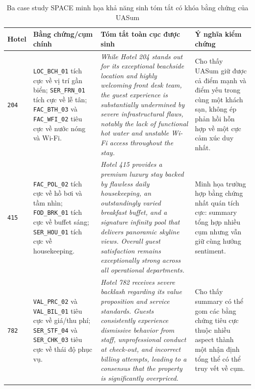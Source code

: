 \begin{table}[tbp]
\centering
\caption{Ba case study SPACE minh họa khả năng sinh tóm tắt có khóa bằng chứng của UASum}
\label{tab:method1-space-case-summary}
\scriptsize
\setlength{\tabcolsep}{3pt}
\renewcommand{\arraystretch}{1.10}
\begin{tabularx}{\textwidth}{L{0.12\textwidth} L{0.30\textwidth} Y Y}
\toprule
\textbf{Hotel} & \textbf{Bằng chứng/cụm chính} & \textbf{Tóm tắt toàn cục được sinh} & \textbf{Ý nghĩa kiểm chứng} \\
\midrule
\texttt{204} &
\texttt{LOC\_BCH\_01} tích cực về vị trí gần biển; \texttt{SER\_FRN\_01} tích cực về lễ tân; \texttt{FAC\_BTH\_03} và \texttt{FAC\_WFI\_02} tiêu cực về nước nóng và Wi-Fi. &
\textit{While Hotel 204 stands out for its exceptional beachside location and highly welcoming front desk team, the guest experience is substantially undermined by severe infrastructural flaws, notably the lack of functional hot water and unstable Wi-Fi access throughout the stay.} &
Cho thấy UASum giữ được cả điểm mạnh và điểm yếu trong cùng một khách sạn, không ép phản hồi hỗn hợp về một cực cảm xúc duy nhất. \\
\addlinespace
\texttt{415} &
\texttt{FAC\_POL\_02} tích cực về hồ bơi và tầm nhìn; \texttt{FOD\_BRK\_01} tích cực về buffet sáng; \texttt{SER\_HOU\_01} tích cực về housekeeping. &
\textit{Hotel 415 provides a premium luxury stay backed by flawless daily housekeeping, an outstandingly varied breakfast buffet, and a signature infinity pool that delivers panoramic skyline views. Overall guest satisfaction remains exceptionally strong across all operational departments.} &
Minh họa trường hợp bằng chứng nhất quán tích cực: summary tổng hợp nhiều cụm nhưng vẫn giữ cùng hướng sentiment. \\
\addlinespace
\texttt{782} &
\texttt{VAL\_PRC\_02} và \texttt{VAL\_BIL\_01} tiêu cực về giá/thu phí; \texttt{SER\_STF\_04} và \texttt{SER\_CHK\_03} tiêu cực về thái độ phục vụ. &
\textit{Hotel 782 receives severe backlash regarding its value proposition and service standards. Guests consistently experience dismissive behavior from staff, unprofessional conduct at check-out, and incorrect billing attempts, leading to a consensus that the property is significantly overpriced.} &
Cho thấy summary có thể gom các bằng chứng tiêu cực thuộc nhiều aspect thành một nhận định tổng thể có thể truy vết về cụm. \\
\bottomrule
\end{tabularx}
\end{table}

